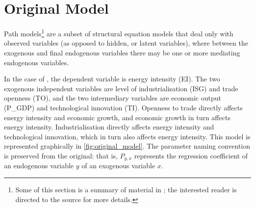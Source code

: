 \documentclass[11pt,a4paper]{article}
\begin{document}
\section{Original Model}\label{sec:original_model}
Path models\footnote{ 
Some of this section is a summary of material in \cite{klinePrinciplesPracticeStructural2016}; the interested reader is directed to the source for more details.
} are a subset of structural equation models that deal only with observed variables (as opposed to hidden, or latent variables), where between the exogenous and final endogenous variables there may be one or more mediating endogenous variables.

In the case of \cite{panHowIndustrializationTrade2019}, the dependent variable is energy intensity (EI). The two exogenous independent variables are level of industrialisation (ISG) and trade openness (TO), and the two intermediary variables are economic output (P\_GDP) and technological innovation (TI). 
Openness to trade directly affects energy intensity and economic growth, and economic growth in turn affects energy intensity. 
Industrialisation directly affects  energy intensity and technological innovation, which in turn also affects energy intensity.
This model is represented graphically in \cref{fig:original_model}. 
The parameter naming convention is preserved from the original: that is, $P_{y,x}$ represents the regression coefficient of an endogenous variable $y$ of an exogenous variable $x$.
\end{document}
